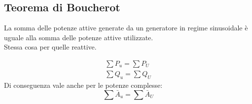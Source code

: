 \documentclass[../main.tex]{subfiles}
\begin{document}
	\subsection{Teorema di Boucherot}
	\begin{theorem}
		La somma delle potenze attive generate da un generatore in regime sinusoidale è uguale alla somma delle potenze attive utilizzate.\\
		Stessa cosa per quelle reattive.
	\end{theorem}
	\begin{gather}
		\sum P_u=\sum P_U \\
		\sum Q_u=\sum Q_U 
	\end{gather}
	Di conseguenza vale anche per le potenze complesse:
	\begin{equation}
		\sum \bar A _u=\sum \bar A_U 	
	\end{equation}
\end{document}
